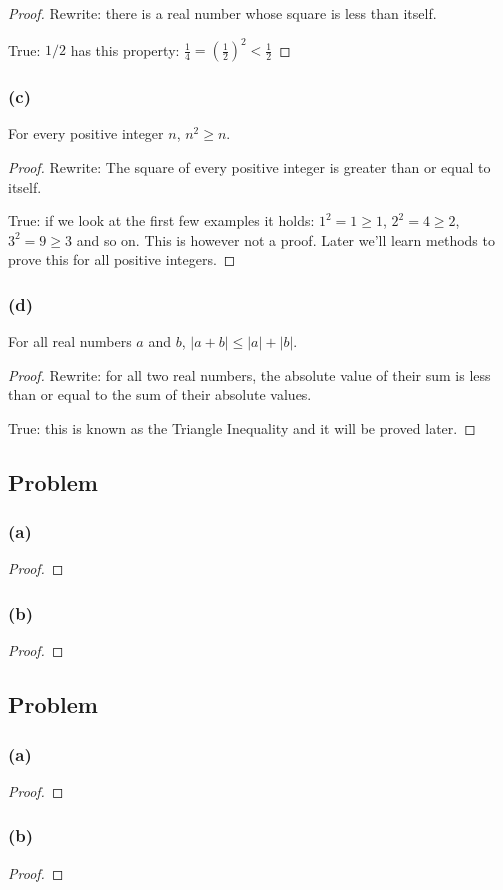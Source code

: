 \documentclass[14pt]{extarticle}
\newcommand{\dps}{\displaystyle}
\begin{document}
\begin{proof}
Rewrite: there is a real number whose square is less than itself.

True: $1/2$ has this property: $\dps \frac{1}{4} = \left(\frac{1}{2}\right)^2 < \frac{1}{2}$
\end{proof}

\subsubsection{(c)}
For every positive integer $n$, $n^2 \geq n$.

\begin{proof}
Rewrite: The square of every positive integer is greater than or equal to itself.

True: if we look at the first few examples it holds: $1^2 = 1 \geq 1$, $2^2 = 4 \geq 2$, $3^2 = 9 \geq 3$ and so on. This is however not a proof. Later we'll learn methods to prove this for all positive integers.
\end{proof}

\subsubsection{(d)}
For all real numbers $a$ and $b$, $|a + b| \leq |a| + |b|$.

\begin{proof}
Rewrite: for all two real numbers, the absolute value of their sum is less than or equal to the sum of their absolute values.

True: this is known as the Triangle Inequality and it will be proved later.
\end{proof}

\subsection{Problem}

\subsubsection{(a)}

\begin{proof}
\end{proof}

\subsubsection{(b)}

\begin{proof}
\end{proof}

\subsection{Problem}

\subsubsection{(a)}

\begin{proof}
\end{proof}

\subsubsection{(b)}

\begin{proof}
\end{proof}
\end{document}
